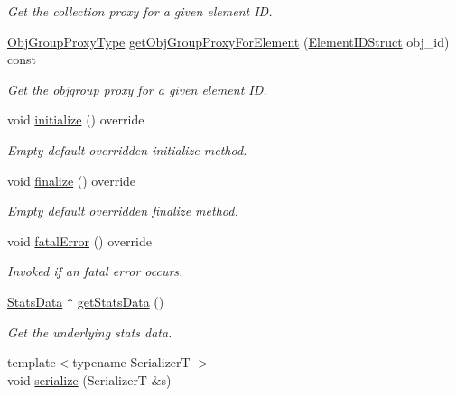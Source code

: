 \begin{DoxyCompactItemize}
\begin{DoxyCompactList}\small\item\em Get the collection proxy for a given element ID. \end{DoxyCompactList}\item 
\hyperlink{namespacevt_ad7cae989df485fccca57f0792a880a8e}{Obj\+Group\+Proxy\+Type} \hyperlink{structvt_1_1vrt_1_1collection_1_1balance_1_1_node_stats_a4a5312c428f08b526097d146a24b5766}{get\+Obj\+Group\+Proxy\+For\+Element} (\hyperlink{namespacevt_1_1vrt_1_1collection_1_1balance_a9f5b53fafb270212279a4757d2c4cd28}{Element\+I\+D\+Struct} obj\+\_\+id) const
\begin{DoxyCompactList}\small\item\em Get the objgroup proxy for a given element ID. \end{DoxyCompactList}\item 
void \hyperlink{structvt_1_1vrt_1_1collection_1_1balance_1_1_node_stats_a0c60d1566daa6465f56b09e27058d6a1}{initialize} () override
\begin{DoxyCompactList}\small\item\em Empty default overridden initialize method. \end{DoxyCompactList}\item 
void \hyperlink{structvt_1_1vrt_1_1collection_1_1balance_1_1_node_stats_a267ac0f73734b89797be774b0bd6e7d1}{finalize} () override
\begin{DoxyCompactList}\small\item\em Empty default overridden finalize method. \end{DoxyCompactList}\item 
void \hyperlink{structvt_1_1vrt_1_1collection_1_1balance_1_1_node_stats_a16f7bc87be8e1ed23aaaa01d585c9f3d}{fatal\+Error} () override
\begin{DoxyCompactList}\small\item\em Invoked if an fatal error occurs. \end{DoxyCompactList}\item 
\hyperlink{structvt_1_1vrt_1_1collection_1_1balance_1_1_stats_data}{Stats\+Data} $\ast$ \hyperlink{structvt_1_1vrt_1_1collection_1_1balance_1_1_node_stats_acaa90ee226b8e183ac4881c1aa86da46}{get\+Stats\+Data} ()
\begin{DoxyCompactList}\small\item\em Get the underlying stats data. \end{DoxyCompactList}\item 
{\footnotesize template$<$typename SerializerT $>$ }\\void \hyperlink{structvt_1_1vrt_1_1collection_1_1balance_1_1_node_stats_a7f61076bf921e424b55e0b5e82c9d989}{serialize} (SerializerT \&s)
\end{DoxyCompactItemize}
